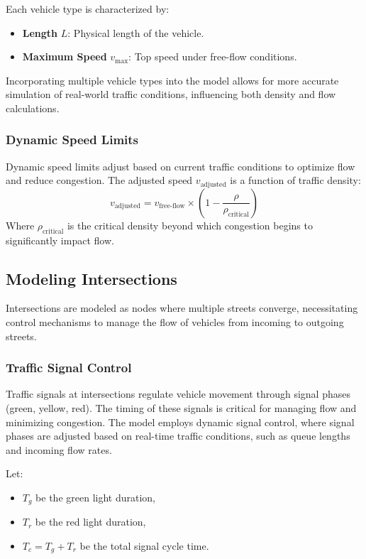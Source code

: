 \documentclass[conference]{IEEEtran}
\begin{document}
Each vehicle type is characterized by:
\begin{itemize}
    \item \textbf{Length} $L$: Physical length of the vehicle.
    \item \textbf{Maximum Speed} $v_{\text{max}}$: Top speed under free-flow conditions.
\end{itemize}

Incorporating multiple vehicle types into the model allows for more accurate simulation of real-world traffic conditions, influencing both density and flow calculations.

\subsubsection{Dynamic Speed Limits}
Dynamic speed limits adjust based on current traffic conditions to optimize flow and reduce congestion. The adjusted speed $v_{\text{adjusted}}$ is a function of traffic density:
\[
v_{\text{adjusted}} = v_{\text{free-flow}} \times \left(1 - \frac{\rho}{\rho_{\text{critical}}}\right)
\]
Where $\rho_{\text{critical}}$ is the critical density beyond which congestion begins to significantly impact flow.

\subsection{Modeling Intersections}
Intersections are modeled as nodes where multiple streets converge, necessitating control mechanisms to manage the flow of vehicles from incoming to outgoing streets.

\subsubsection{Traffic Signal Control}
Traffic signals at intersections regulate vehicle movement through signal phases (green, yellow, red). The timing of these signals is critical for managing flow and minimizing congestion. The model employs dynamic signal control, where signal phases are adjusted based on real-time traffic conditions, such as queue lengths and incoming flow rates.

Let:
\begin{itemize}
    \item $T_g$ be the green light duration,
    \item $T_r$ be the red light duration,
    \item $T_c = T_g + T_r$ be the total signal cycle time.
\end{itemize}
\end{document}
